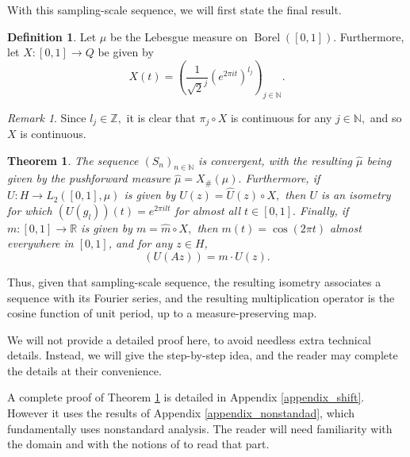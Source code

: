 \documentclass{amsart}
\newtheorem{theorem}{Theorem}[section]
\theoremstyle{definition}
\newtheorem{definition}[thm]{Definition}
\theoremstyle{remark}
\newtheorem{remark}[thm]{Remark}
\def \Borel{\operatorname{Borel}}
\def \HMU{\hat{\mu}}
\def \HU{\hat{U}}
\def \Hm{\hat{m}}
\begin{document}
With this sampling-scale sequence, we will first state the final result.

\begin{definition}
	Let $\mu$ be the Lebesgue measure on $\Borel([0,1]).$ Furthermore, let $X:[0,1]\rightarrow Q$ be given by $$X(t)=\left(\frac{1}{\sqrt{2}^j} (e^{2\pi i t})^{l_j}\right)_{j\in\mathbb{N}}.$$
\end{definition}
\begin{remark}
	Since $l_j\in\mathbb{Z},$ it is clear that $\pi_j\circ X$ is continuous for any $j\in\mathbb{N},$ and so $X$ is continuous.
\end{remark}
\begin{theorem}\label{theorem_shift_fourier_series}
	The sequence $(S_n)_{n\in\mathbb{N}}$ is convergent, with the resulting $\HMU$ being given by the pushforward measure $\HMU=X_{\#}(\mu).$ Furthermore, if $U:H\rightarrow L_2([0,1],\mu)$ is given by $U(z)=\HU(z)\circ X,$ then $U$ is an isometry for which $(U(g_l))(t)=e^{2\pi i l t}$ for almost all $t\in [0,1].$ Finally, if $m:[0,1]\rightarrow\mathbb{R}$ is given by $m=\Hm\circ X,$ then $m(t)=\cos(2\pi t)$ almost everywhere in $[0,1]$, and for any $z\in H$, $$(U(Az))=m\cdot U(z).$$
\end{theorem}

Thus, given that sampling-scale sequence, the resulting isometry associates a sequence with its Fourier series, and the resulting multiplication operator is the cosine function of unit period, up to a measure-preserving map.

We will not provide a detailed proof here, to avoid needless extra technical details. Instead, we will give the step-by-step idea, and the reader may complete the details at their convenience. 

A complete proof of Theorem \ref{theorem_shift_fourier_series} is detailed in Appendix \ref{appendix_shift}. However it uses the results of Appendix \ref{appendix_nonstandad}, which fundamentally uses nonstandard analysis. The reader will need familiarity with the domain and with the notions of \cite{nonez2024spectralequivalencesnonstandardsamplings} to read that part.
\end{document}

